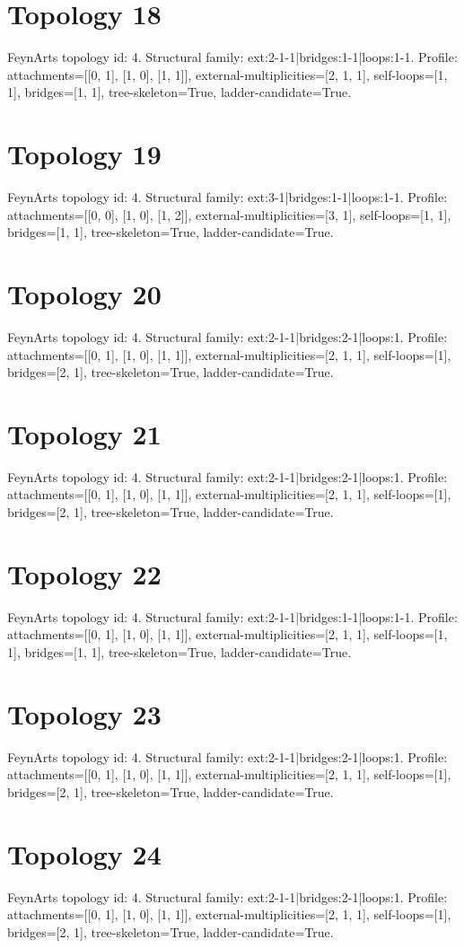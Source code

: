 \documentclass{article}
\begin{document}
\section*{Topology 18}
FeynArts topology id: 4.
Structural family: ext:2-1-1|bridges:1-1|loops:1-1.
Profile: attachments=[[0, 1], [1, 0], [1, 1]], external-multiplicities=[2, 1, 1], self-loops=[1, 1], bridges=[1, 1], tree-skeleton=True, ladder-candidate=True.
\section*{Topology 19}
FeynArts topology id: 4.
Structural family: ext:3-1|bridges:1-1|loops:1-1.
Profile: attachments=[[0, 0], [1, 0], [1, 2]], external-multiplicities=[3, 1], self-loops=[1, 1], bridges=[1, 1], tree-skeleton=True, ladder-candidate=True.
\section*{Topology 20}
FeynArts topology id: 4.
Structural family: ext:2-1-1|bridges:2-1|loops:1.
Profile: attachments=[[0, 1], [1, 0], [1, 1]], external-multiplicities=[2, 1, 1], self-loops=[1], bridges=[2, 1], tree-skeleton=True, ladder-candidate=True.
\section*{Topology 21}
FeynArts topology id: 4.
Structural family: ext:2-1-1|bridges:2-1|loops:1.
Profile: attachments=[[0, 1], [1, 0], [1, 1]], external-multiplicities=[2, 1, 1], self-loops=[1], bridges=[2, 1], tree-skeleton=True, ladder-candidate=True.
\section*{Topology 22}
FeynArts topology id: 4.
Structural family: ext:2-1-1|bridges:1-1|loops:1-1.
Profile: attachments=[[0, 1], [1, 0], [1, 1]], external-multiplicities=[2, 1, 1], self-loops=[1, 1], bridges=[1, 1], tree-skeleton=True, ladder-candidate=True.
\section*{Topology 23}
FeynArts topology id: 4.
Structural family: ext:2-1-1|bridges:2-1|loops:1.
Profile: attachments=[[0, 1], [1, 0], [1, 1]], external-multiplicities=[2, 1, 1], self-loops=[1], bridges=[2, 1], tree-skeleton=True, ladder-candidate=True.
\section*{Topology 24}
FeynArts topology id: 4.
Structural family: ext:2-1-1|bridges:2-1|loops:1.
Profile: attachments=[[0, 1], [1, 0], [1, 1]], external-multiplicities=[2, 1, 1], self-loops=[1], bridges=[2, 1], tree-skeleton=True, ladder-candidate=True.
\end{document}
